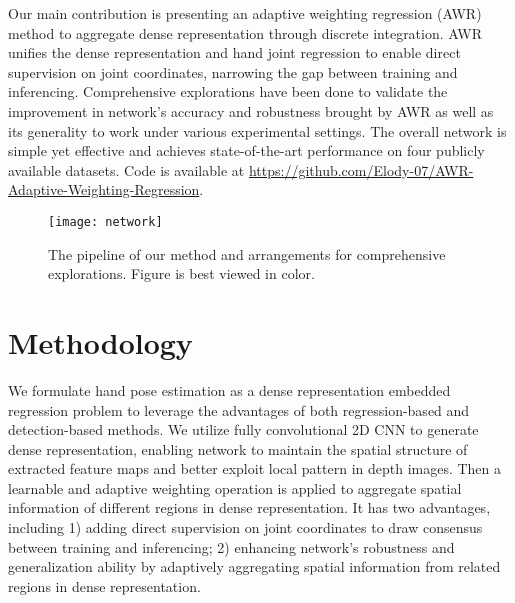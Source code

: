 \documentclass[letterpaper]{article} \usepackage{aaai20}  \usepackage{times}  \usepackage{helvet} \usepackage{courier}  \usepackage[hyphens]{url}  \usepackage{graphicx} \usepackage{amsmath}
\begin{document}
\parskip=0pt

Our main contribution is presenting an adaptive weighting regression (AWR) method to aggregate dense representation through discrete integration. AWR unifies the dense representation and hand joint regression to enable direct supervision on joint coordinates, narrowing the gap between training and inferencing. Comprehensive explorations have been done to validate the improvement in network's accuracy and robustness brought by AWR as well as its generality to work under various experimental settings. The overall network is simple yet effective and achieves state-of-the-art performance on four publicly available datasets. Code is available at \url{https://github.com/Elody-07/AWR-Adaptive-Weighting-Regression}.


\parskip=0pt

\begin{figure}[t]
\centering
\texttt{[image: network]} 
\caption{The pipeline of our method and arrangements for comprehensive explorations. Figure is best viewed in color.}
\end{figure}

\section{Methodology}
We formulate hand pose estimation as a dense representation embedded regression problem to leverage the advantages of both regression-based and detection-based methods. We utilize fully convolutional 2D CNN to generate dense representation, enabling network to maintain the spatial structure of extracted feature maps and better exploit local pattern in depth images. Then a learnable and adaptive weighting operation is applied to aggregate spatial information of different regions in dense representation. It has two advantages, including 1) adding direct supervision on joint coordinates to draw consensus between training and inferencing; 2) enhancing network's robustness and generalization ability by adaptively aggregating spatial information from related regions in dense representation.

\parskip=0pt
\end{document}
